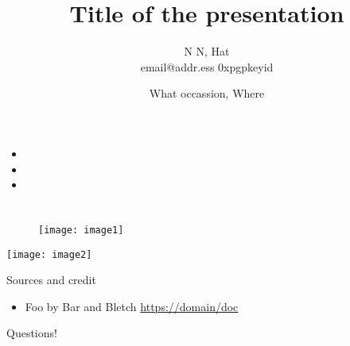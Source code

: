 \documentclass{beamer}
\title{Title of the presentation}
\subtitle{}
\author{N N, Hat \\ email@addr.ess 0xpgpkeyid}
\date[YYYY-MM-DD]{What occassion, Where}
\begin{document}
\begin{frame}
  \titlepage
\end{frame}

\section{}

\begin{frame}{}
  \begin{itemize}
    \item 
    \item 
    \item 
  \end{itemize}
\end{frame}

\section{}

\subsection{}

\begin{frame}{}
  \begin{figure}[ht]
    \texttt{[image: image1]}
  \end{figure}
\end{frame}

\begin{frame}{}
  \begin{center}
    \texttt{[image: image2]}
  \end{center}
\end{frame}

\begin{frame}{Sources and credit}
  \begin{itemize}
  \item Foo by Bar and Bletch \url{https://domain/doc}
  \end{itemize}
\end{frame}

\begin{frame}{}
  \begin{center}
    Questions!
  \end{center}
\end{frame}
\end{document}
